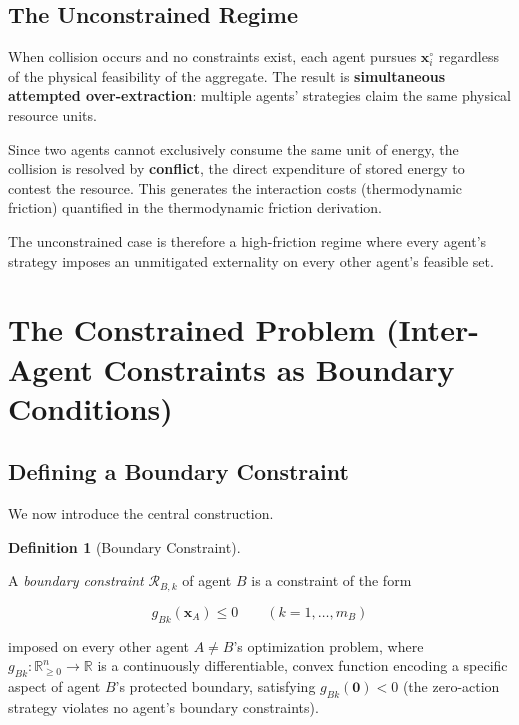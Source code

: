 \documentclass[11pt]{article}
\theoremstyle{plain}
\theoremstyle{definition}
\newtheorem{definition}{Definition}
\theoremstyle{remark}
\let\origsection\section
\renewcommand{\section}{\needspace{12\baselineskip}\origsection}
\let\origsubsection\subsection
\renewcommand{\subsection}{\needspace{7\baselineskip}\origsubsection}
\begin{document}
\subsection{The Unconstrained Regime}\label{the-unconstrained-regime}

When collision occurs and no constraints exist, each agent pursues
\(\mathbf{x}_i^{\circ}\) regardless of the physical feasibility of the
aggregate. The result is \textbf{simultaneous attempted
over-extraction}: multiple agents' strategies claim the same physical
resource units.

Since two agents cannot exclusively consume the same unit of energy, the
collision is resolved by \textbf{conflict}, the direct expenditure of
stored energy to contest the resource. This generates the interaction
costs (thermodynamic friction) quantified in the thermodynamic friction
derivation.

The unconstrained case is therefore a high-friction regime where every
agent's strategy imposes an unmitigated externality on every other
agent's feasible set.

\section{The Constrained Problem (Inter-Agent Constraints as Boundary
Conditions)}\label{the-constrained-problem-inter-agent-constraints-as-boundary-conditions}

\subsection{Defining a Boundary
Constraint}\label{defining-a-boundary-constraint}

We now introduce the central construction.

\begin{definition}[Boundary Constraint]
\label{def-boundary-constraint}

A \emph{boundary constraint} $\mathcal{R}_{B,k}$ of agent $B$ is a constraint of the form

$$g_{Bk}(\mathbf{x}_A) \leq 0 \qquad (k = 1, \ldots, m_B)$$

imposed on every other agent $A \neq B$'s optimization problem, where $g_{Bk} : \mathbb{R}_{\geq 0}^n \to \mathbb{R}$ is a continuously differentiable, convex function encoding a specific aspect of agent $B$'s protected boundary, satisfying $g_{Bk}(\mathbf{0}) < 0$ (the zero-action strategy violates no agent's boundary constraints).
\end{definition}
\end{document}
